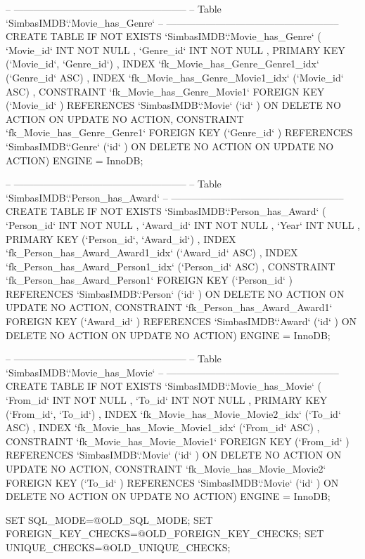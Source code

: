 \begin{spverbatim}
-- -----------------------------------------------------
-- Table `SimbasIMDB`.`Movie_has_Genre`
-- -----------------------------------------------------
CREATE  TABLE IF NOT EXISTS `SimbasIMDB`.`Movie_has_Genre` (
  `Movie_id` INT NOT NULL ,
  `Genre_id` INT NOT NULL ,
  PRIMARY KEY (`Movie_id`, `Genre_id`) ,
  INDEX `fk_Movie_has_Genre_Genre1_idx` (`Genre_id` ASC) ,
  INDEX `fk_Movie_has_Genre_Movie1_idx` (`Movie_id` ASC) ,
  CONSTRAINT `fk_Movie_has_Genre_Movie1`
    FOREIGN KEY (`Movie_id` )
    REFERENCES `SimbasIMDB`.`Movie` (`id` )
    ON DELETE NO ACTION
    ON UPDATE NO ACTION,
  CONSTRAINT `fk_Movie_has_Genre_Genre1`
    FOREIGN KEY (`Genre_id` )
    REFERENCES `SimbasIMDB`.`Genre` (`id` )
    ON DELETE NO ACTION
    ON UPDATE NO ACTION)
ENGINE = InnoDB;


-- -----------------------------------------------------
-- Table `SimbasIMDB`.`Person_has_Award`
-- -----------------------------------------------------
CREATE  TABLE IF NOT EXISTS `SimbasIMDB`.`Person_has_Award` (
  `Person_id` INT NOT NULL ,
  `Award_id` INT NOT NULL ,
  `Year` INT NULL ,
  PRIMARY KEY (`Person_id`, `Award_id`) ,
  INDEX `fk_Person_has_Award_Award1_idx` (`Award_id` ASC) ,
  INDEX `fk_Person_has_Award_Person1_idx` (`Person_id` ASC) ,
  CONSTRAINT `fk_Person_has_Award_Person1`
    FOREIGN KEY (`Person_id` )
    REFERENCES `SimbasIMDB`.`Person` (`id` )
    ON DELETE NO ACTION
    ON UPDATE NO ACTION,
  CONSTRAINT `fk_Person_has_Award_Award1`
    FOREIGN KEY (`Award_id` )
    REFERENCES `SimbasIMDB`.`Award` (`id` )
    ON DELETE NO ACTION
    ON UPDATE NO ACTION)
ENGINE = InnoDB;


-- -----------------------------------------------------
-- Table `SimbasIMDB`.`Movie_has_Movie`
-- -----------------------------------------------------
CREATE  TABLE IF NOT EXISTS `SimbasIMDB`.`Movie_has_Movie` (
  `From_id` INT NOT NULL ,
  `To_id` INT NOT NULL ,
  PRIMARY KEY (`From_id`, `To_id`) ,
  INDEX `fk_Movie_has_Movie_Movie2_idx` (`To_id` ASC) ,
  INDEX `fk_Movie_has_Movie_Movie1_idx` (`From_id` ASC) ,
  CONSTRAINT `fk_Movie_has_Movie_Movie1`
    FOREIGN KEY (`From_id` )
    REFERENCES `SimbasIMDB`.`Movie` (`id` )
    ON DELETE NO ACTION
    ON UPDATE NO ACTION,
  CONSTRAINT `fk_Movie_has_Movie_Movie2`
    FOREIGN KEY (`To_id` )
    REFERENCES `SimbasIMDB`.`Movie` (`id` )
    ON DELETE NO ACTION
    ON UPDATE NO ACTION)
ENGINE = InnoDB;

SET SQL_MODE=@OLD_SQL_MODE;
SET FOREIGN_KEY_CHECKS=@OLD_FOREIGN_KEY_CHECKS;
SET UNIQUE_CHECKS=@OLD_UNIQUE_CHECKS;



\end{spverbatim}
